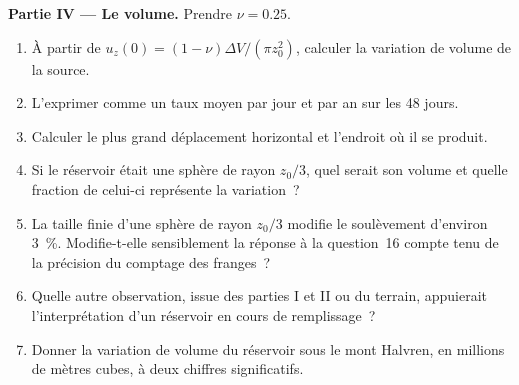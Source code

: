 \begin{problem}
\medskip\noindent\textbf{Partie IV --- Le volume.} Prendre $\nu = 0.25$.
\begin{enumerate}[resume]
\item À partir de $u_z(0) = (1 - \nu)\Delta V/(\pi z_0^2)$, calculer la variation de volume
  de la source.
\item L'exprimer comme un taux moyen par jour et par an sur les 48 jours.
\item Calculer le plus grand déplacement horizontal et l'endroit où il se produit.
\item Si le réservoir était une sphère de rayon $z_0/3$, quel serait son volume
  et quelle fraction de celui-ci représente la variation~?
\item La taille finie d'une sphère de rayon $z_0/3$ modifie le soulèvement d'environ
  \qty{3}{\percent}. Modifie-t-elle sensiblement la réponse à la question~16
  compte tenu de la précision du comptage des franges~?
\item Quelle autre observation, issue des parties I et II ou du terrain,
  appuierait l'interprétation d'un réservoir en cours de remplissage~?
\item Donner la variation de volume du réservoir sous le mont Halvren, en
  millions de mètres cubes, à deux chiffres significatifs.
\end{enumerate}
\end{problem}
